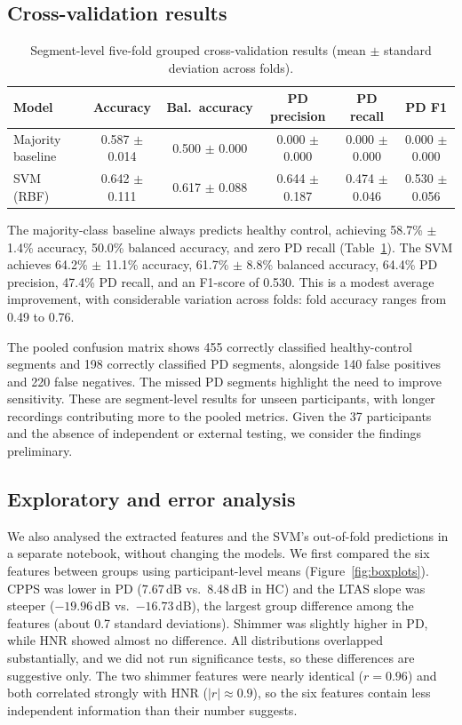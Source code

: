 \documentclass[11pt]{article}
\begin{document}
\subsection{Cross-validation results}

\begin{table}[t]
  \centering
  \small
  \begin{tabular}{lccccc}
    \hline
    \textbf{Model} & \textbf{Accuracy} & \textbf{Bal.\ accuracy} & \textbf{PD precision}
      & \textbf{PD recall} & \textbf{PD F1} \\
    \hline
    Majority baseline & 0.587 $\pm$ 0.014 & 0.500 $\pm$ 0.000 & 0.000 $\pm$ 0.000 &
      0.000 $\pm$ 0.000 & 0.000 $\pm$ 0.000 \\
    SVM (RBF) & 0.642 $\pm$ 0.111 & 0.617 $\pm$ 0.088 & 0.644 $\pm$ 0.187 &
      0.474 $\pm$ 0.046 & 0.530 $\pm$ 0.056 \\
    \hline
  \end{tabular}
  \caption{Segment-level five-fold grouped cross-validation results (mean $\pm$ standard
    deviation across folds).}
  \label{tab:cv}
\end{table}

The majority-class baseline always predicts healthy control, achieving 58.7\%
$\pm$ 1.4\% accuracy, 50.0\% balanced accuracy, and zero PD recall (Table~\ref{tab:cv}).
The SVM achieves 64.2\% $\pm$ 11.1\% accuracy, 61.7\% $\pm$ 8.8\% balanced accuracy, 64.4\%
PD precision, 47.4\% PD recall, and an F1-score of 0.530. This is a modest average
improvement, with considerable variation across folds: fold accuracy ranges from 0.49 to
0.76.

The pooled confusion matrix shows 455 correctly classified healthy-control segments and
198 correctly classified PD segments, alongside 140 false positives and 220 false
negatives. The missed PD segments highlight the need to improve sensitivity. These are
segment-level results for unseen participants, with longer recordings contributing more to
the pooled metrics. Given the 37 participants and the absence of independent or external
testing, we consider the findings preliminary.

\subsection{Exploratory and error analysis}

We also analysed the extracted features and the SVM's out-of-fold predictions in a
separate notebook, without changing the models. We first compared the six features between
groups using participant-level means (Figure~\ref{fig:boxplots}). CPPS was lower in PD
(7.67\,dB vs.\ 8.48\,dB in HC) and the LTAS slope was steeper ($-19.96$\,dB vs.\
$-16.73$\,dB), the largest group difference among the features (about 0.7 standard
deviations). Shimmer was slightly higher in PD, while HNR showed almost no difference. All
distributions overlapped substantially, and we did not run significance tests, so these
differences are suggestive only. The two shimmer features were nearly identical
($r=0.96$) and both correlated strongly with HNR ($|r|\approx 0.9$), so the six features
contain less independent information than their number suggests.
\end{document}
